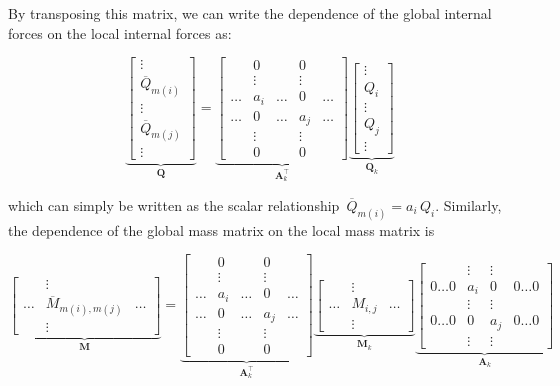 By transposing this matrix, we can write the dependence of the global internal forces on the local internal forces as:

$$
\underbrace{
\begin{bmatrix}
\vdots \\ \overline{Q}_{m(i)} \\ \vdots \\ \overline{Q}_{m(j)} \\ \vdots
\end{bmatrix}
}_{\boldsymbol{Q}}
=
\underbrace{
\begin{bmatrix}
& 0 & & 0 & \\
& \vdots & & \vdots & \\
\hdots & a_{i} & \hdots & 0 & \hdots \\
\hdots & 0 & \hdots & a_{j} & \hdots \\
& \vdots & & \vdots & \\
& 0 & & 0 &
\end{bmatrix}
}_{\boldsymbol{A}_{k}^\intercal}
\underbrace{
\begin{bmatrix}
\vdots \\ Q_{i} \\ \vdots \\ Q_{j} \\ \vdots
\end{bmatrix}
}_{\boldsymbol{Q}_{k}}
$$

which can simply be written as the scalar relationship~$\overline{Q}_{m(i)} = a_{i}\,Q_{i}$.
Similarly, the dependence of the global mass matrix on the local mass matrix is

$$
\underbrace{
\begin{bmatrix}
& \vdots & \\
\hdots & \overline{M}_{m(i),m(j)} & \hdots \\
& \vdots &
\end{bmatrix}
}_{\boldsymbol{M}}
=
\underbrace{
\begin{bmatrix}
& 0 & & 0 & \\
& \vdots & & \vdots & \\
\hdots & a_{i} & \hdots & 0 & \hdots \\
\hdots & 0 & \hdots & a_{j} & \hdots \\
& \vdots & & \vdots & \\
& 0 & & 0 &
\end{bmatrix}
}_{\boldsymbol{A}_{k}^\intercal}
\underbrace{
\begin{bmatrix}
& \vdots & \\
\hdots & M_{i,j} & \hdots \\
& \vdots &
\end{bmatrix}
}_{\boldsymbol{M}_{k}}
\underbrace{
\begin{bmatrix}
& \vdots & \vdots & \\
0 \hdots 0 & a_{i} & 0 & 0 \hdots 0 \\
& \vdots & \vdots & \\
0 \hdots 0 & 0 & a_{j} & 0 \hdots 0 \\
& \vdots & \vdots &
\end{bmatrix}
}_{\boldsymbol{A}_{k}}
$$

